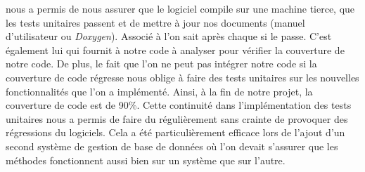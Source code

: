 \Travis{} nous a permis de nous assurer que le logiciel compile sur une machine tierce, que les tests unitaires passent et de mettre à jour nos documents (manuel d'utilisateur ou \textit{Doxygen}). Associé à \Github{} l'on sait après chaque \Commit{} si le \Build{} passe. C'est également lui qui fournit à \Coveralls{} notre code à analyser pour vérifier la couverture de notre code. De plus, le fait que l'on ne peut pas intégrer notre code si la couverture de code régresse nous oblige à faire des tests unitaires sur les nouvelles fonctionnalités que l'on a implémenté. Ainsi, à la fin de notre projet, la couverture de code est de 90\%. Cette continuité dans l'implémentation des tests unitaires nous a permis de faire du \Refactoring{} régulièrement sans crainte de provoquer des régressions du logiciels. Cela a été particulièrement efficace lors de l'ajout d'un second système de gestion de base de données où l'on devait s'assurer que les méthodes fonctionnent aussi bien sur un système que sur l'autre.  


